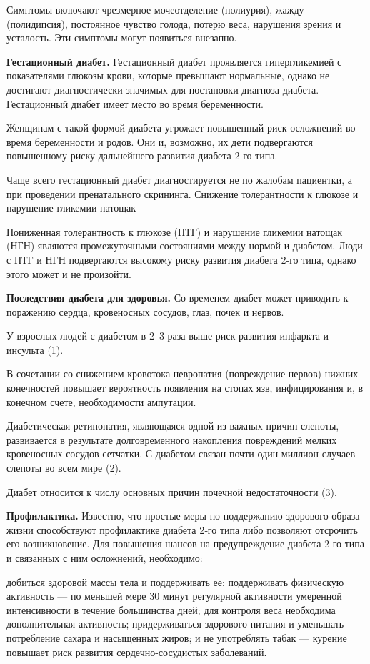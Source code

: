 Симптомы включают чрезмерное мочеотделение (полиурия), жажду (полидипсия), постоянное чувство голода, потерю веса, нарушения зрения и усталость. Эти симптомы могут появиться внезапно.

\textbf{Гестационный диабет.} Гестационный диабет проявляется гипергликемией с показателями глюкозы крови, которые превышают нормальные, однако не достигают диагностически значимых для постановки диагноза диабета. Гестационный диабет имеет место во время беременности.

Женщинам с такой формой диабета угрожает повышенный риск осложнений во время беременности и родов. Они и, возможно, их дети подвергаются повышенному риску дальнейшего развития диабета 2‑го типа.

Чаще всего гестационный диабет диагностируется не по жалобам пациентки, а при проведении пренатального скрининга.
Снижение толерантности к глюкозе и нарушение гликемии натощак

Пониженная толерантность к глюкозе (ПТГ) и нарушение гликемии натощак (НГН) являются промежуточными состояниями между нормой и диабетом. Люди с ПТГ и НГН подвергаются высокому риску развития диабета 2‑го типа, однако этого может и не произойти.


\textbf{Последствия диабета для здоровья.}
Со временем диабет может приводить к поражению сердца, кровеносных сосудов, глаз, почек и нервов.

У взрослых людей с диабетом в 2–3 раза выше риск развития инфаркта и инсульта (1).

В сочетании со снижением кровотока невропатия (повреждение нервов) нижних конечностей повышает вероятность появления на стопах язв, инфицирования и, в конечном счете, необходимости ампутации.

Диабетическая ретинопатия, являющаяся одной из важных причин слепоты, развивается в результате долговременного накопления повреждений мелких кровеносных сосудов сетчатки. С диабетом связан почти один миллион случаев слепоты во всем мире (2).

Диабет относится к числу основных причин почечной недостаточности (3).

\textbf{Профилактика.} Известно, что простые меры по поддержанию здорового образа жизни способствуют профилактике диабета 2‑го типа либо позволяют отсрочить его возникновение. Для повышения шансов на предупреждение диабета 2‑го типа и связанных с ним осложнений, необходимо:

добиться здоровой массы тела и поддерживать ее; поддерживать физическую активность — по меньшей мере 30 минут регулярной активности умеренной интенсивности в течение большинства дней; для контроля веса необходима дополнительная активность; придерживаться здорового питания и уменьшать потребление сахара и насыщенных жиров; и не употреблять табак — курение повышает риск развития сердечно-сосудистых заболеваний.


